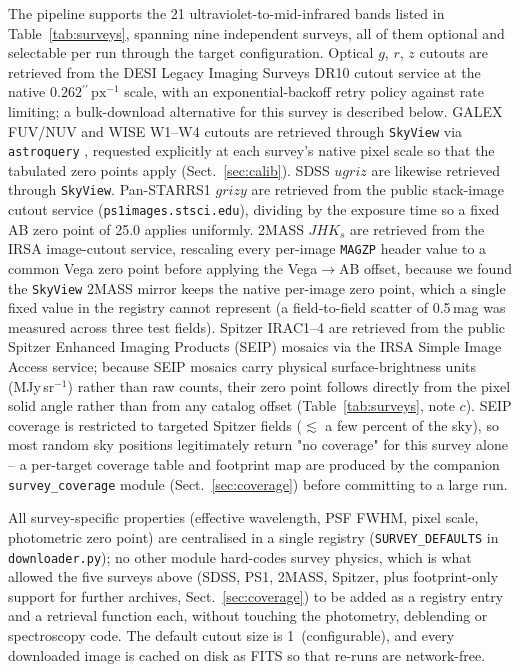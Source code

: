 \documentclass{aa}
\newcommand{\arcsecond}{\ensuremath{^{\prime\prime}}}
\begin{document}
The pipeline supports the 21 ultraviolet-to-mid-infrared bands listed in
Table~\ref{tab:surveys}, spanning nine independent surveys, all of them
optional and selectable per run through the target configuration. Optical
$g$, $r$, $z$ cutouts are retrieved from the DESI Legacy Imaging Surveys
DR10 cutout service \citep{dey2019} at the native
$0.262\arcsecond\,\mathrm{px}^{-1}$ scale, with an exponential-backoff
retry policy against rate limiting; a bulk-download alternative for this
survey is described below. GALEX FUV/NUV and WISE W1--W4 cutouts are
retrieved through \texttt{SkyView} \citep{mcglynn1998} via
\texttt{astroquery} \citep{ginsburg2019}, requested explicitly at each
survey's native pixel scale so that the tabulated zero points apply
(Sect.~\ref{sec:calib}). SDSS $ugriz$ \citep{york2000} are likewise
retrieved through \texttt{SkyView}. Pan-STARRS1 $grizy$
\citep{chambers2016} are retrieved from the public stack-image cutout
service (\texttt{ps1images.stsci.edu}), dividing by the exposure time so
a fixed AB zero point of 25.0 applies uniformly. 2MASS $JHK_s$
\citep{skrutskie2006} are retrieved from the IRSA image-cutout service,
rescaling every per-image \texttt{MAGZP} header value to a common Vega
zero point before applying the Vega$\to$AB offset, because we found the
\texttt{SkyView} 2MASS mirror keeps the native per-image zero point,
which a single fixed value in the registry cannot represent (a
field-to-field scatter of 0.5\,mag was measured across three test
fields). Spitzer IRAC1--4 are retrieved from the public Spitzer Enhanced
Imaging Products (SEIP) mosaics via the IRSA Simple Image Access service;
because SEIP mosaics carry physical surface-brightness units
(MJy\,sr$^{-1}$) rather than raw counts, their zero point follows
directly from the pixel solid angle rather than from any catalog offset
(Table~\ref{tab:surveys}, note $c$). SEIP coverage is restricted to
targeted Spitzer fields ($\lesssim$ a few percent of the sky), so most
random sky positions legitimately return "no coverage" for this survey
alone -- a per-target coverage table and footprint map are produced by
the companion \texttt{survey\_coverage} module (Sect.~\ref{sec:coverage})
before committing to a large run.

All survey-specific properties (effective wavelength, PSF FWHM, pixel
scale, photometric zero point) are centralised in a single registry
(\texttt{SURVEY\_DEFAULTS} in \texttt{downloader.py}); no other module
hard-codes survey physics, which is what allowed the five surveys above
(SDSS, PS1, 2MASS, Spitzer, plus footprint-only support for further
archives, Sect.~\ref{sec:coverage}) to be added as a registry entry and a
retrieval function each, without touching the photometry, deblending or
spectroscopy code. The default cutout size is 1\arcmin\ (configurable),
and every downloaded image is cached on disk as FITS so that re-runs are
network-free.
\end{document}
